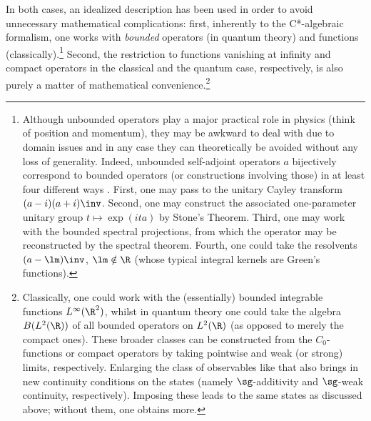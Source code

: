 \documentclass[12pt]{article}
\begin{document}
In both cases, an idealized description has been used in order to avoid unnecessary mathematical complications: 
first, inherently to the C*-algebraic formalism, one works with \emph{bounded} operators (in quantum theory) and functions (classically).\footnote{Although unbounded operators play a major practical role in physics (think of position and momentum), they may be awkward to deal with due to domain issues and in any case they can theoretically be avoided without any loss of generality. Indeed, unbounded self-adjoint operators $a$ bijectively correspond to bounded operators (or constructions involving those) in at least four different ways \cite{RS1}. First, one may pass to the unitary Cayley transform $(a-i)(a+i)\inv$. Second, one may construct the associated one-parameter unitary group $t\mapsto \exp(ita)$ by Stone's Theorem. Third, one may work with the bounded spectral projections, from which the operator may be reconstructed by the spectral theorem. Fourth, one could take the resolvents $(a-\lm)\inv$, $\lm\notin\R$ (whose typical integral kernels are Green's functions).} Second, the restriction to functions vanishing at infinity and compact operators in the classical and the quantum case, respectively, is also purely a matter of mathematical convenience.\footnote{Classically, one could work with the (essentially) bounded integrable functions
$L^{\infty}(\R^2)$, whilst in quantum theory one could take the algebra $B(L^2(\R))$ of all bounded operators on $L^2(\R)$ (as opposed to merely the compact ones). These broader classes can be constructed from the $C_0$-functions or compact operators by taking pointwise and weak (or strong)  limits, respectively.  Enlarging the class of observables like that also brings in new continuity conditions on the states (namely $\sg$-additivity and $\sg$-weak continuity, respectively). Imposing these leads to the same states as discussed above; without them, one obtains more.}
\end{document}
